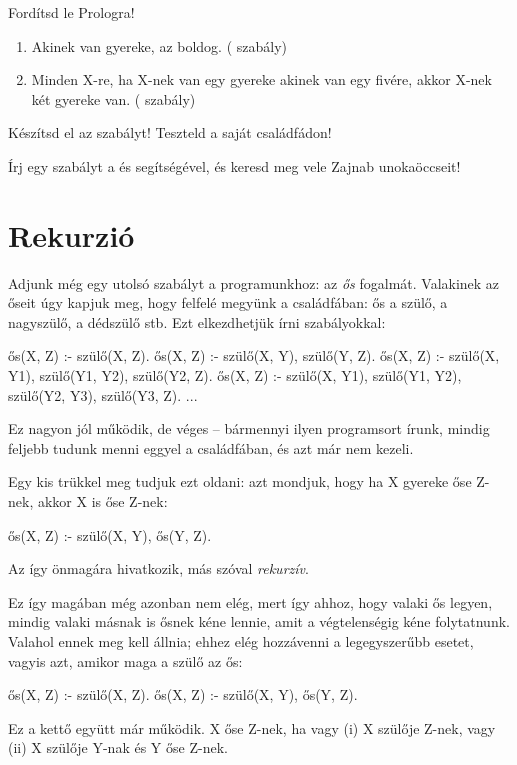 \begin{problem}
Fordítsd le Prologra!
\begin{enumerate}  
\item Akinek van gyereke, az boldog. (
  szabály)
\item Minden X-re, ha X-nek van egy gyereke akinek
  van egy fivére, akkor X-nek két gyereke
  van. ( szabály)
\end{enumerate}
\end{problem}
\begin{problem}
  Készítsd el az  szabályt!
  Teszteld a saját családfádon!
\end{problem}
\begin{problem}
  Írj egy  szabályt a 
  és  segítségével, és keresd meg vele
  Zajnab unokaöccseit!
\end{problem}

\section{Rekurzió}
Adjunk még egy utolsó szabályt a programunkhoz: az
\emph{ős} fogalmát. Valakinek az őseit úgy kapjuk
meg, hogy felfelé megyünk a családfában: ős a szülő,
a nagyszülő, a dédszülő stb. Ezt elkezdhetjük írni
szabályokkal:
\begin{program}
ős(X, Z) :- szülő(X, Z).
ős(X, Z) :- szülő(X, Y), szülő(Y, Z).
ős(X, Z) :-
    szülő(X, Y1), szülő(Y1, Y2), szülő(Y2, Z).
ős(X, Z) :-
    szülő(X, Y1), szülő(Y1, Y2),
    szülő(Y2, Y3), szülő(Y3, Z).
...
\end{program}
Ez nagyon jól működik, de véges -- bármennyi ilyen
programsort írunk, mindig feljebb tudunk menni
eggyel a családfában, és azt már nem kezeli.

Egy kis trükkel meg tudjuk ezt oldani: azt mondjuk,
hogy ha X gyereke őse Z-nek, akkor X is őse Z-nek:
\begin{program}
ős(X, Z) :- szülő(X, Y), ős(Y, Z).
\end{program}
Az  így önmagára hivatkozik, más szóval
\emph{rekurzív}.

Ez így magában még azonban nem elég, mert így ahhoz,
hogy valaki ős legyen, mindig valaki másnak is ősnek
kéne lennie, amit a végtelenségig kéne folytatnunk.
Valahol ennek meg kell állnia; ehhez elég
hozzávenni a legegyszerűbb esetet, vagyis azt,
amikor maga a szülő az ős:
\begin{program}
ős(X, Z) :- szülő(X, Z).
ős(X, Z) :- szülő(X, Y), ős(Y, Z).
\end{program}
Ez a kettő együtt már működik. X őse Z-nek, ha vagy
(i) X szülője Z-nek, vagy (ii) X szülője Y-nak és Y
őse Z-nek.

